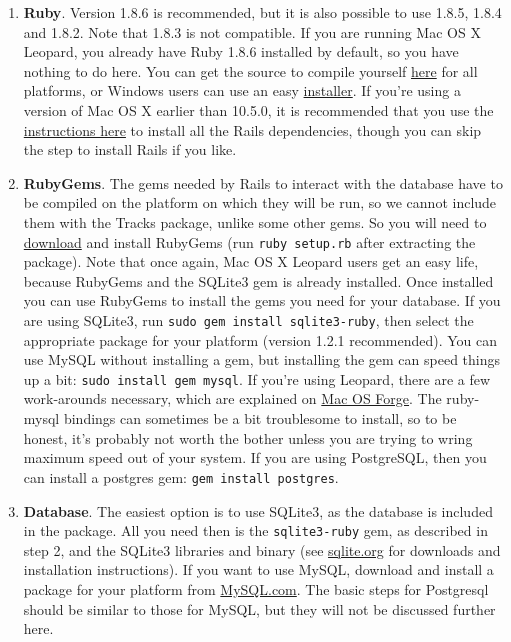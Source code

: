 \documentclass[10pt,twoside]{memoir}
\begin{document}
\begin{enumerate}


\item \textbf{Ruby}. Version 1.8.6 is recommended, but it is also possible to use 1.8.5, 1.8.4 and 1.8.2. Note that 1.8.3 is not compatible. If you are running Mac OS X Leopard, you already have Ruby 1.8.6 installed by default, so you have nothing to do here. You can get the source to compile yourself \href{http://ftp.ruby-lang.org/pub/ruby/1.8/ruby-1.8.6.tar.gz}{here} for all platforms, or Windows users can use an easy \href{http://rubyforge.org/frs/?group_id=167}{installer}. If you're using a version of Mac OS X earlier than 10.5.0, it is recommended that you use the \href{http://hivelogic.com/narrative/articles/ruby-rails-mongrel-mysql-osx}{instructions here} to install all the Rails dependencies, though you can skip the step to install Rails if you like.

\item \textbf{RubyGems}. The gems needed by Rails to interact with the database have to be compiled on the platform on which they will be run, so we cannot include them with the Tracks package, unlike some other gems. So you will need to \href{http://rubyforge.org/frs/?group_id=126}{download} and install RubyGems (run \texttt{ruby setup.rb} after extracting the package). Note that once again, Mac OS X Leopard users get an easy life, because RubyGems and the SQLite3 gem is already installed. Once installed you can use RubyGems to install the gems you need for your database. If you are using SQLite3, run \texttt{sudo gem install sqlite3-ruby}, then select the appropriate package for your platform (version 1.2.1 recommended). You can use MySQL without installing a gem, but installing the gem can speed things up a bit: \texttt{sudo install gem mysql}. If you're using Leopard, there are a few work-arounds necessary, which are explained on \href{http://trac.macosforge.org/projects/ruby/wiki/Troubleshooting#IcannotbuildrubymysqlonLeopardwithmysql.combinaries}{Mac OS Forge}. The ruby-mysql bindings can sometimes be a bit troublesome to install, so to be honest, it's probably not worth the bother unless you are trying to wring maximum speed out of your system. If you are using PostgreSQL, then you can install a postgres gem: \texttt{gem install postgres}.

\item \textbf{Database}. The easiest option is to use SQLite3, as the database is included in the package. All you need then is the \texttt{sqlite3-ruby} gem, as described in step 2, and the SQLite3 libraries and binary (see \href{http://sqlite.org/download.html}{sqlite.org} for downloads and installation instructions). If you want to use MySQL, download and install a package for your platform from \href{http://dev.mysql.com/downloads/mysql/5.0.html}{MySQL.com}. The basic steps for Postgresql should be similar to those for MySQL, but they will not be discussed further here.
\end{enumerate}
\end{document}
